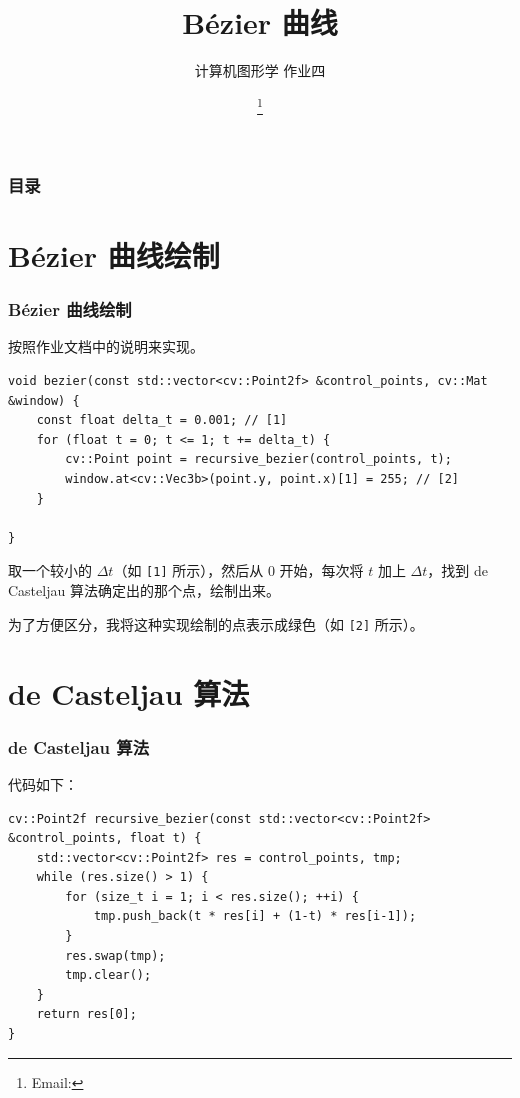 \documentclass{ctexbeamer}
\author{
    \thestudentID
    \theauthor
    \thanks{Email: \theemail}
}
\institute[\theshortinst]{\theinst}
\title{B\'ezier 曲线}
\subtitle{计算机图形学 作业四}
\begin{document}
    \begin{frame}
        \titlepage
    \end{frame}

    \begin{frame}
        \frametitle{目录}
        \tableofcontents
    \end{frame}

    \section{B\'ezier 曲线绘制}

    \begin{frame}[fragile]
        \frametitle{B\'ezier 曲线绘制}
    
        按照作业文档中的说明来实现。 \pause
        {
            \small
            \begin{verbatim}
void bezier(const std::vector<cv::Point2f> &control_points, cv::Mat &window) {
    const float delta_t = 0.001; // [1]
    for (float t = 0; t <= 1; t += delta_t) {
        cv::Point point = recursive_bezier(control_points, t);
        window.at<cv::Vec3b>(point.y, point.x)[1] = 255; // [2]
    }

}
            \end{verbatim}
        }

        取一个较小的 $\Delta t$（如 \verb|[1]| 所示），然后从 0 开始，每次将 $t$ 加上
        $\Delta t$，找到 de Casteljau 算法确定出的那个点，绘制出来。\pause

        为了方便区分，我将这种实现绘制的点表示成绿色（如 \verb|[2]| 所示）。
    \end{frame}

    \section{de Casteljau 算法}
    \begin{frame}[fragile]
        \frametitle{de Casteljau 算法}
    
        代码如下：

        {
            \small
            \begin{verbatim}
cv::Point2f recursive_bezier(const std::vector<cv::Point2f> &control_points, float t) {
    std::vector<cv::Point2f> res = control_points, tmp;
    while (res.size() > 1) {
        for (size_t i = 1; i < res.size(); ++i) {
            tmp.push_back(t * res[i] + (1-t) * res[i-1]);
        }
        res.swap(tmp);
        tmp.clear();
    }
    return res[0];
}
            \end{verbatim}
        }
    
    \end{frame}
\end{document}
